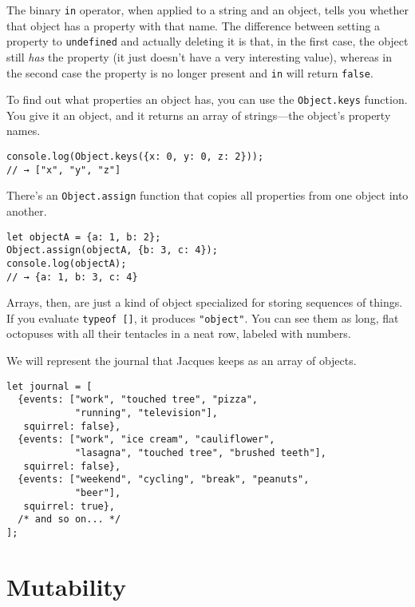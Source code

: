 The binary \lstinline`in` operator, when applied to a string and an object, tells you whether that object has a property with that name. The difference between setting a property to \lstinline`undefined` and actually deleting it is that, in the first case, the object still \emph{has} the property (it just doesn't have a very interesting value), whereas in the second case the property is no longer present and \lstinline`in` will return \lstinline`false`.

To find out what properties an object has, you can use the \lstinline`Object.keys` function. You give it an object, and it returns an array of strings—the object's property names.

\begin{lstlisting}
console.log(Object.keys({x: 0, y: 0, z: 2}));
// → ["x", "y", "z"]
\end{lstlisting}
\noindent

There's an \lstinline`Object.assign` function that copies all properties from one object into another.

\begin{lstlisting}
let objectA = {a: 1, b: 2};
Object.assign(objectA, {b: 3, c: 4});
console.log(objectA);
// → {a: 1, b: 3, c: 4}
\end{lstlisting}
\noindent{}

Arrays, then, are just a kind of object specialized for storing sequences of things. If you evaluate \lstinline`typeof []`, it produces \lstinline`"object"`. You can see them as long, flat octopuses with all their tentacles in a neat row, labeled with numbers.

We will represent the journal that Jacques keeps as an array of objects.

\begin{lstlisting}
let journal = [
  {events: ["work", "touched tree", "pizza",
            "running", "television"],
   squirrel: false},
  {events: ["work", "ice cream", "cauliflower",
            "lasagna", "touched tree", "brushed teeth"],
   squirrel: false},
  {events: ["weekend", "cycling", "break", "peanuts",
            "beer"],
   squirrel: true},
  /* and so on... */
];
\end{lstlisting}
\noindent

\section{Mutability}

